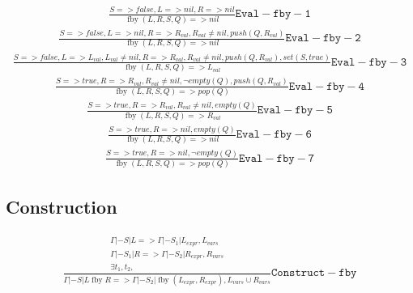 \documentclass{scrartcl}
\DeclareMathOperator{\fby}{fby}
\begin{document}
    \begin{align*}
    \frac{
        S => false, L => nil, R => nil
    }{
        \fby(L, R, S, Q) => nil
    }\mathtt{Eval-fby-1}
    \end{align*}
    \begin{align*}
    \frac{
        S => false, L => nil, R => R_{val}, R_{val} \neq nil, push(Q, R_{val})
    }{
        \fby(L, R, S, Q) => nil
    }\mathtt{Eval-fby-2}
    \end{align*}
    \begin{align*}
    \frac{
        S => false, L => L_{val}, L_{val} \neq nil, R => R_{val}, R_{val} \neq nil, push(Q, R_{val}), set(S, true)
    }{
        \fby(L, R, S, Q) => L_{val}
    }\mathtt{Eval-fby-3}
    \end{align*}
    \begin{align*}
    \frac{
        S => true, R => R_{val}, R_{val} \neq nil, \lnot empty(Q), push(Q, R_{val})
    }{
        \fby(L, R, S, Q) => pop(Q)
    }\mathtt{Eval-fby-4}
    \end{align*}
    \begin{align*}
    \frac{
        S => true, R => R_{val}, R_{val} \neq nil, empty(Q)
    }{
        \fby(L, R, S, Q) => R_{val}
    }\mathtt{Eval-fby-5}
    \end{align*}
    \begin{align*}
    \frac{
        S => true, R => nil, empty(Q)
    }{
        \fby(L, R, S, Q) => nil
    }\mathtt{Eval-fby-6}
    \end{align*}
    \begin{align*}
    \frac{
        S => true, R => nil, \lnot empty(Q)
    }{
        \fby(L, R, S, Q) => pop(Q)
    }\mathtt{Eval-fby-7}
    \end{align*}
    
    \subsection{Construction}
    
    \begin{align*}
    \frac{
        \begin{matrix}
        \Gamma |- S | L => \Gamma |- S_1 | L_{expr}, L_{vars} \\
        \Gamma |- S_1 | R => \Gamma |- S_2 | R_{expr}, R_{vars} \\
        \exists t_1, t_2, 
        \end{matrix}
    }{
        \Gamma |- S | L \fby R => \Gamma |- S_2 | \fby(L_{expr}, R_{expr}), L_{vars} \cup R_{vars}
    }\mathtt{Construct-fby}
    \end{align*}
    
\end{document}

